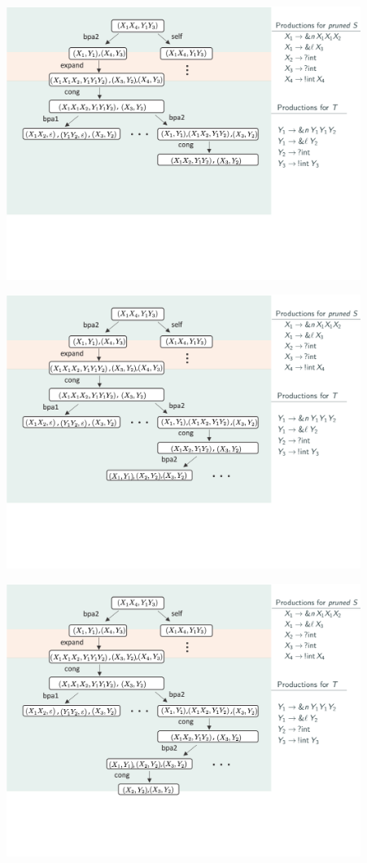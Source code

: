 \documentclass[10pt]{beamer}
\begin{document}
\begin{frame}
	\includegraphics[width=11.5cm]{img/exemplo-4}\smallskip
\end{frame}

\begin{frame}
	\includegraphics[width=11.5cm]{img/exemplo-3}\smallskip
\end{frame}

\begin{frame}
	\includegraphics[width=11.5cm]{img/exemplo-2}\smallskip
\end{frame}
\end{document}
